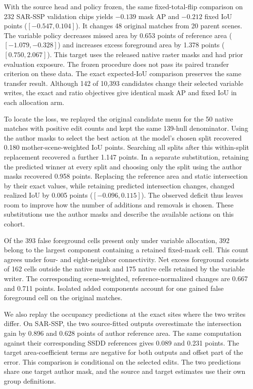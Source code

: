 \documentclass[journal]{IEEEtran}
\begin{document}
With the source head and policy frozen, the same fixed-total-flip comparison on 232 SAR-SSP validation chips yields \(-0.139\) mask AP and \(-0.212\) fixed IoU points (\([-0.547,0.104]\)). It changes 48 original matches from 20 parent scenes. The variable policy decreases missed area by 0.653 points of reference area (\([-1.079,-0.328]\)) and increases excess foreground area by 1.378 points (\([0.750,2.067]\)). This target uses the released native raster masks and had prior evaluation exposure. The frozen procedure does not pass its paired transfer criterion on these data. The exact expected-IoU comparison preserves the same transfer result. Although 142 of 10,393 candidates change their selected variable writes, the exact and ratio objectives give identical mask AP and fixed IoU in each allocation arm.

To locate the loss, we replayed the original candidate menu for the 50 native matches with positive edit counts and kept the same 139-hull denominator. Using the author masks to select the best action at the model's chosen split recovered 0.180 mother-scene-weighted IoU points. Searching all splits after this within-split replacement recovered a further 1.147 points. In a separate substitution, retaining the predicted winner at every split and choosing only the split using the author masks recovered 0.958 points. Replacing the reference area and static intersection by their exact values, while retaining predicted intersection changes, changed realized IoU by 0.005 points (\([-0.096,0.115]\)). The observed deficit thus leaves room to improve how the number of additions and removals is chosen. These substitutions use the author masks and describe the available actions on this cohort.

Of the 393 false foreground cells present only under variable allocation, 392 belong to the largest component containing a retained fixed-mask cell. This count agrees under four- and eight-neighbor connectivity. Net excess foreground consists of 162 cells outside the native mask and 175 native cells retained by the variable writer. The corresponding scene-weighted, reference-normalized changes are 0.667 and 0.711 points. Isolated added components account for one gained false foreground cell on the original matches.

We also replay the occupancy predictions at the exact sites where the two writes differ. On SAR-SSP, the two source-fitted outputs overestimate the intersection gain by 0.896 and 0.628 points of author reference area. The same computation against their corresponding SSDD references gives 0.089 and 0.231 points. The target area-coefficient terms are negative for both outputs and offset part of the error. This comparison is conditional on the selected edits. The two predictions share one target author mask, and the source and target estimates use their own group definitions.
\end{document}
